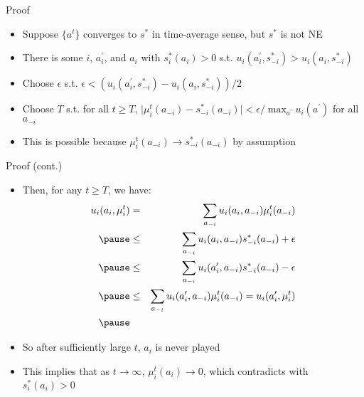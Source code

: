 \documentclass[11pt,aspectratio=169]{beamer}
\begin{document}
  
  \begin{frame}{Proof}
   \begin{itemize}[<+->]
   \setlength{\itemsep}{1.2em}
    \item Suppose $\{a^t\}$ converges to $s^*$ in time-average sense, but $s^*$ is not NE
    \item There is some $i$, $a_i^\prime$, and $a_i$ with $s_i^*(a_i)>0$ s.t. $u_i(a_i^\prime,s_{-i}^*)>u_i(a_i,s_{-i}^*)$
    \item Choose $\epsilon$ s.t. $\epsilon < \left(u_i(a_i^\prime,s_{-i}^*) - u_i(a_i,s_{-i}^*)\right)/2$
    \item Choose $T$ s.t. for all $t\ge T$, $\vert \mu_i^t(a_{-i}) - s_{-i}^*(a_{-i}) \vert < \epsilon/\max_{a^\prime} u_i(a^\prime)$ for all $a_{-i}$
    \item This is possible because $\mu_i^t(a_{-i})\to s_{-i}^*(a_{-i})$ by assumption
   \end{itemize}
  \end{frame}
  
  
  \begin{frame}{Proof (cont.)}
   \begin{itemize}
    \item<1-> Then, for any $t \ge T$, we have:
    \begin{eqnarray*}
     u_i(a_i, \mu_i^t) & = & \sum_{a_{-i}}u_i(a_i, a_{-i})\mu_i^t(a_{-i}) \\ \pause
     & \le & \sum_{a_{-i}}u_i(a_i, a_{-i})s_{-i}^*(a_{-i}) + \epsilon \\ \pause
     & \le & \sum_{a_{-i}}u_i(a_i^\prime, a_{-i})s_{-i}^*(a_{-i}) - \epsilon \\ \pause
     & \le & \sum_{a_{-i}}u_i(a_i^\prime, a_{-i})\mu_i^t(a_{-i}) = u_i(a_i^\prime, \mu_i^t) \\ \pause
    \end{eqnarray*}
    \vspace{-2em}
    \item<5-> So after sufficiently large $t$, $a_i$ is never played
    \item<6-> This implies that as $t \to \infty$, $\mu_i^t(a_i)\to 0$, which contradicts with $s_i^*(a_i) > 0$
   \end{itemize}
  \end{frame}
  
\end{document}
